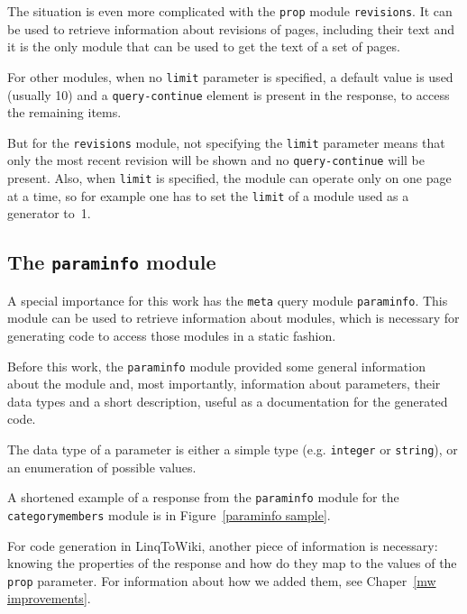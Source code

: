 The situation is even more complicated with the \texttt{prop} module \texttt{revisions}.
It can be used to retrieve information about revisions of pages, including their text
and it is the only module that can be used to get the text of a set of pages.

For other modules, when no \texttt{limit} parameter is specified, a default value is used (usually 10)
and a \texttt{query-continue} element is present in the response, to access the remaining items.

But for the \texttt{revisions} module, not specifying the \texttt{limit} parameter means that only the most
recent revision will be shown and no \texttt{query-continue} will be present.
Also, when \texttt{limit} is specified, the module can operate only on one page at a time,
so for example one has to set the \texttt{limit} of a module used as a generator to~1.

\subsection{The \texttt{paraminfo} module}
\label{paraminfo}

A special importance for this work has the \texttt{meta} query module \texttt{paraminfo}.
This module can be used to retrieve information about modules,
which is necessary for generating code to access those modules in a static fashion.

Before this work, the \texttt{paraminfo} module provided some general information about the module
and, most importantly, information about parameters, their data types and a short description,
useful as a documentation for the generated code.

The data type of a parameter is either a simple type (e.g. \texttt{integer} or \texttt{string}),
or an enumeration of possible values.

A shortened example of a response from the \texttt{paraminfo} module
for the \texttt{categorymembers} module is in Figure~\ref{paraminfo sample}.

For code generation in LinqToWiki, another piece of information is necessary:
knowing the properties of the response and how do they map to the values of the \texttt{prop} parameter.
For information about how we added them, see Chaper~\ref{mw improvements}.


